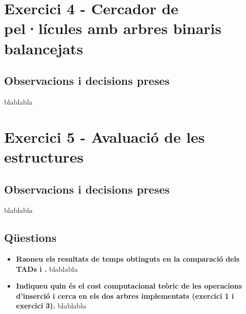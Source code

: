 \section{Exercici 4 - Cercador de pel·lícules amb arbres binaris balancejats}
\subsection{Observacions i decisions preses}
blablabla

\section{Exercici 5 - Avaluació de les estructures}
\subsection{Observacions i decisions preses}
blablabla
\subsection{Qüestions}
\begin{itemize}
	\item \textbf{Raoneu els resultats de temps obtinguts en la comparació dels TADs  i .}
	\newline
	blablabla
	\item \textbf{Indiqueu quin és el cost computacional teòric de les operacions d’inserció i cerca en els dos arbres implementats (exercici 1 i exercici 3).}
	\newline
	blablabla
\end{itemize}